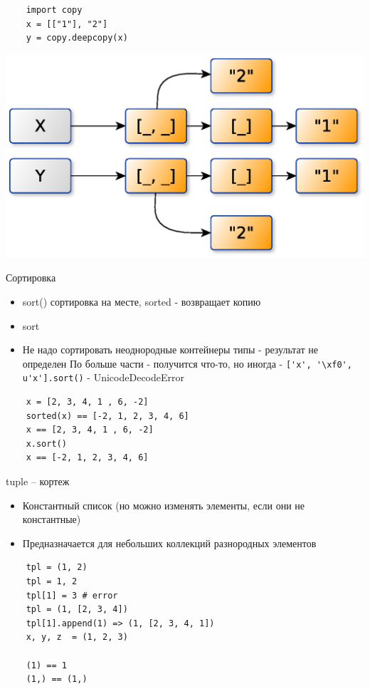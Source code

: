 \documentclass{article}
\begin{document}
\begin{lstlisting}
	import copy
	x = [["1"], "2"]
	y = copy.deepcopy(x)
\end{lstlisting}
\includegraphics[scale=0.8]{images/refs3.eps}

\newpage

\begin{center} Сортировка \end{center}
\begin{itemize}
	\item sort() сортировка на месте, sorted - возвращает копию
	\item sort
	\item Не надо сортировать неоднородные контейнеры типы - результат не определен
		По больше части - получится что-то, но иногда -
		\lstinline!['x', '\xf0', u'x'].sort()! - UnicodeDecodeError
\end{itemize}
\begin{lstlisting}
	x = [2, 3, 4, 1 , 6, -2]
	sorted(x) == [-2, 1, 2, 3, 4, 6]
	x == [2, 3, 4, 1 , 6, -2]
	x.sort()
	x == [-2, 1, 2, 3, 4, 6]
\end{lstlisting}
\newpage

\begin{center} tuple – кортеж \end{center}
\begin{itemize}
	\item Константный список (но можно изменять элементы, если они не константные)
	\item Предназначается для небольших коллекций разнородных элементов
\end{itemize}
\vspace{15pt}
\begin{lstlisting}
	tpl = (1, 2)
	tpl = 1, 2
	tpl[1] = 3 # error
	tpl = (1, [2, 3, 4])
	tpl[1].append(1) => (1, [2, 3, 4, 1])
	x, y, z  = (1, 2, 3)

	(1) == 1
	(1,) == (1,)
\end{lstlisting}
\newpage
\end{document}
